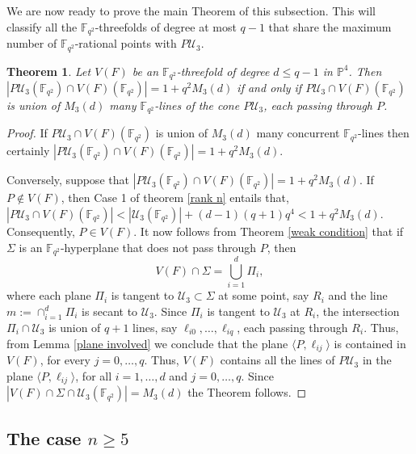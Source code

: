 \documentclass[10pt,a4paper,oneside]{amsproc}
\newtheorem{theorem}{Theorem}[section]
\newcommand{\Fqt}{\mathbb{F}_{q^2}}
\newcommand{\U}{\mathcal{U}}
\def\PP{{\mathbb P}}
\begin{document}
We are now ready to prove the main Theorem of this subsection. This will classify all the $\Fqt$-threefolds of degree at most $q-1$ that share the maximum number of $\Fqt$-rational points with $P\U_3$. 

\begin{theorem}\label{main n=4}
 Let $V(F)$ be an $\Fqt$-threefold of degree $d\leq q-1$ in $\PP^4$. Then $|P\U_3(\Fqt)\cap V(F)(\Fqt)|=1+q^2M_3(d)$ if and only if $P\U_3\cap V(F)(\Fqt)$ is union of $M_3(d)$ many $\Fqt$-lines of the cone $P\U_3$, each passing through $P$.    
\end{theorem}
\begin{proof}
 If $P\U_3\cap V(F)(\Fqt)$ is union of $M_3(d)$ many concurrent $\Fqt$-lines then certainly $|P\U_3(\Fqt)\cap V(F)(\Fqt)|=1+q^2M_3(d)$. 
 
 Conversely, suppose that $|P\U_3(\Fqt)\cap V(F)(\Fqt)|=1+q^2M_3(d)$. If $P\notin V(F)$, then Case 1 of theorem \ref{rank n} entails that, $|P\U_3\cap V(F)(\Fqt)|<|\U_3(\Fqt)|+(d-1)(q+1)q^4<1+q^2M_3(d)$. Consequently, $P\in V(F)$. It now follows from Theorem \ref{weak condition} that if $\Sigma$ is an $\Fqt$-hyperplane that does not pass through $P$, then $$V(F)\cap \Sigma=\bigcup_{i=1}^d \Pi_i,$$ where each plane $\Pi_i$ is tangent to $\U_3\subset \Sigma$ at some point, say $R_i$ and the line $m:=\cap_{i=1}^d\Pi_i$ is secant to $\U_3$. Since $\Pi_i$ is tangent to $\U_3$ at $R_i$, the intersection $\Pi_i\cap \U_3$ is union of $q+1$ lines, say $\ell_{i0},\dots,\ell_{iq}$, each passing through $R_i$. Thus, from Lemma \ref{plane involved} we conclude that the plane $\langle P,\ell_{ij} \rangle$ is contained in $V(F)$, for every $j=0,\dots,q$. Thus, $V(F)$ contains all the lines of $P\U_3$ in the plane $\langle P,\ell_{ij} \rangle$, for all $i=1,\dots,d$ and $j=0,\dots,q$. Since $|V(F)\cap\Sigma\cap\U_3(\Fqt)|=M_3(d)$ the Theorem follows. 
\end{proof}
\subsection{The case $n\geq 5$}\label{bigger than 5}
\end{document}
